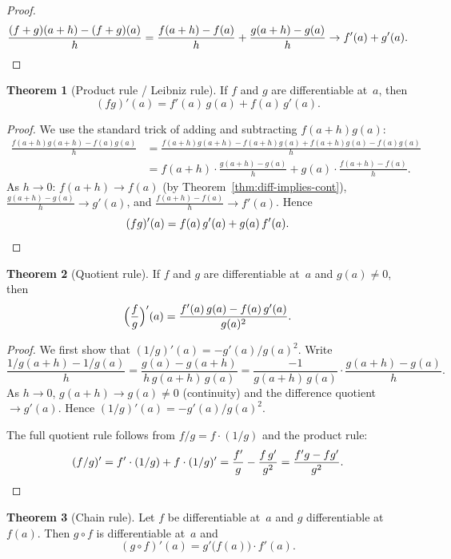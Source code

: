\documentclass[12pt,a4paper,openany]{book}
\theoremstyle{definition}
\newtheorem{theorem}{Theorem}[chapter]
\theoremstyle{remark}
\begin{document}
\begin{proof}
\[
  \frac{(f+g)(a+h)-(f+g)(a)}{h}
  = \frac{f(a+h)-f(a)}{h} + \frac{g(a+h)-g(a)}{h}
  \to f'(a)+g'(a). \qedhere
\]
\end{proof}

\begin{theorem}[Product rule / Leibniz rule]\label{thm:product-rule}
If $f$ and $g$ are differentiable at~$a$, then
\[
  (fg)'(a) = f'(a)\,g(a) + f(a)\,g'(a).
\]
\end{theorem}

\begin{proof}
We use the standard trick of adding and subtracting $f(a+h)g(a)$:
\begin{align*}
  \frac{f(a+h)g(a+h)-f(a)g(a)}{h}
  &= \frac{f(a+h)g(a+h) - f(a+h)g(a) + f(a+h)g(a) - f(a)g(a)}{h}\\
  &= f(a+h)\cdot\frac{g(a+h)-g(a)}{h}
     + g(a)\cdot\frac{f(a+h)-f(a)}{h}.
\end{align*}
As $h\to 0$: $f(a+h)\to f(a)$ (by
Theorem~\ref{thm:diff-implies-cont}),
$\frac{g(a+h)-g(a)}{h}\to g'(a)$, and
$\frac{f(a+h)-f(a)}{h}\to f'(a)$.  Hence
\[
  (fg)'(a) = f(a)\,g'(a) + g(a)\,f'(a). \qedhere
\]
\end{proof}

\begin{theorem}[Quotient rule]\label{thm:quotient-rule}
If $f$ and $g$ are differentiable at~$a$ and $g(a)\neq 0$, then
\[
  \Bigl(\frac{f}{g}\Bigr)'(a)
  = \frac{f'(a)\,g(a)-f(a)\,g'(a)}{g(a)^2}.
\]
\end{theorem}

\begin{proof}
We first show that $(1/g)'(a)=-g'(a)/g(a)^2$.  Write
\[
  \frac{1/g(a+h)-1/g(a)}{h}
  = \frac{g(a)-g(a+h)}{h\,g(a+h)\,g(a)}
  = \frac{-1}{g(a+h)\,g(a)}\cdot\frac{g(a+h)-g(a)}{h}.
\]
As $h\to 0$, $g(a+h)\to g(a)\neq 0$ (continuity) and the difference
quotient $\to g'(a)$.  Hence $(1/g)'(a)=-g'(a)/g(a)^2$.

The full quotient rule follows from $f/g=f\cdot(1/g)$ and the product
rule:
\[
  (f/g)' = f'\cdot(1/g) + f\cdot(1/g)'
  = \frac{f'}{g} - \frac{f\,g'}{g^2}
  = \frac{f'g - fg'}{g^2}. \qedhere
\]
\end{proof}

\begin{theorem}[Chain rule]\label{thm:chain-rule}
Let $f$ be differentiable at~$a$ and $g$ differentiable at $f(a)$.
Then $g\circ f$ is differentiable at~$a$ and
\[
  (g\circ f)'(a) = g'\bigl(f(a)\bigr)\cdot f'(a).
\]
\end{theorem}
\end{document}
